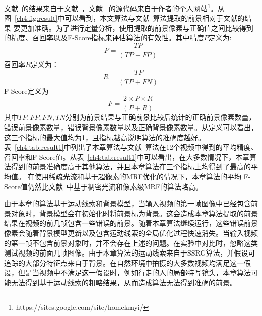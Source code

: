 文献~的结果来自于文献~，文献~ 的源代码来自于作者的个人网站\footnote{https://sites.google.com/site/homekmyi/}。从图~\ref{ch4:fig:result}中可以看到，本文算法与文献~算法提取的前景相对于文献\cite{kwak2011Generalized,5.8s}的结果 要更加准确。为了进行定量分析，使用提取的前景像素与正确值之间比较得到的精度、召回率以及F-Score指标来评估算法的有效性。其中精度$P$定义为:
$$ P = \frac{TP}{(TP+FP)}$$
召回率$R$定义为：
$$R = \frac{TP}{(TP+FN)}$$
F-Score定义为
$$F = \frac{2 \times P \times R}{(P + R)}$$
其中$TP,FP,FN,TN$分别为前景结果与正确前景比较后统计的正确前景像素数量，错误前景像素数量，错误背景像素数量以及正确背景像素数量。从定义可以看出，这三个指标的最大值均为1，且指标越高说明算法的准确度越好。表~\ref{ch4:tab:result1}中列出了本章算法与文献~算法在12个视频中得到的平均精度、召回率和F-Score值。从表~\ref{ch4:tab:result1}中可以看出，在大多数情况下，本章算法得到的前景准确度高于其他算法，并且本章算法在三个指标上均得到了最高的平均值。 在使用稀疏光流和基于超像素的MRF优化的情况下，本章算法的平均 F-Score值仍然比文献~中基于稠密光流和像素级MRF的算法略高。\par

由于本章的算法基于运动线索和背景模型，当输入视频的第一帧图像中已经包含前景对象时，背景模型会在初始化时将前景标为背景。这会造成本章算法提取的前景结果在视频的前几帧包含一些错误的前景。随着本章算法继续运行，这些错误前景像素会随着背景模型更新以及包含运动线索的全局优化过程快速消失。当输入视频的第一帧不包含前景对象时，并不会存在上述的问题。在实验中对比时，忽略这类测试视频的前面几帧图像。由于本章算法的运动线索来自于SSRG算法，并假设可追踪的大部分特征点来自于背景。在自然环境中拍摄的大多数视频均满足这一假设，但是当视频中不满足这一假设时，例如行走的人的局部特写镜头，本章算法可能无法得到基于运动线索的粗略结果，从而造成算法无法得到准确的前景。\par


